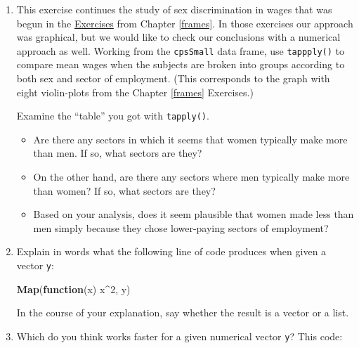 \documentclass[]{book}
\makeatletter
\newenvironment{Shaded}{\begin{snugshade}}{\end{snugshade}}
\newcommand{\KeywordTok}[1]{\textcolor[rgb]{0.13,0.29,0.53}{\textbf{#1}}}
\newcommand{\DecValTok}[1]{\textcolor[rgb]{0.00,0.00,0.81}{#1}}
\newcommand{\ControlFlowTok}[1]{\textcolor[rgb]{0.13,0.29,0.53}{\textbf{#1}}}
\newcommand{\OperatorTok}[1]{\textcolor[rgb]{0.81,0.36,0.00}{\textbf{#1}}}
\newcommand{\NormalTok}[1]{#1}
\providecommand{\tightlist}{%
  \setlength{\itemsep}{0pt}\setlength{\parskip}{0pt}}
\newenvironment{kframe}{%
\medskip{}
\setlength{\fboxsep}{.8em}
 \def\at@end@of@kframe{}%
 \ifinner\ifhmode%
  \def\at@end@of@kframe{\end{minipage}}%
  \begin{minipage}{\columnwidth}%
 \fi\fi%
 \def\FrameCommand##1{\hskip\@totalleftmargin \hskip-\fboxsep
 \colorbox{shadecolor}{##1}\hskip-\fboxsep
     \hskip-\linewidth \hskip-\@totalleftmargin \hskip\columnwidth}%
 \MakeFramed {\advance\hsize-\width
   \@totalleftmargin\z@ \linewidth\hsize
   \@setminipage}}%
 {\par\unskip\endMakeFramed%
 \at@end@of@kframe}
\renewenvironment{Shaded}{\begin{kframe}}{\end{kframe}}
\theoremstyle{definition}
\theoremstyle{definition}
\theoremstyle{definition}
\theoremstyle{remark}
\makeatother
\begin{document}
{\begin{enumerate}
  Your task is to use \texttt{quantile()} to write a function called
  \texttt{iqRange()} that will return the interquartile range of any
  given numerical vector. Then use that function with \texttt{tapply()}
  to get the interquartile ranges for the fastest speeds in the
  \texttt{m111survey} data, where the students are broken into groups
  according to both seating preference and sex.
\item
  This exercise continues the study of sex discrimination in wages that
  was begun in the \protect\hyperlink{frames-exercises}{Exercises} from
  Chapter \ref{frames}. In those exercises our approach was graphical,
  but we would like to check our conclusions with a numerical approach
  as well. Working from the \texttt{cpsSmall} data frame, use
  \texttt{tappply()} to compare mean wages when the subjects are broken
  into groups according to both sex and sector of employment. (This
  corresponds to the graph with eight violin-plots from the Chapter
  \ref{frames} Exercises.)

  Examine the ``table'' you got with \texttt{tapply()}.

  \begin{itemize}
  \tightlist
  \item
    Are there any sectors in which it seems that women typically make
    more than men. If so, what sectors are they?
  \item
    On the other hand, are there any sectors where men typically make
    more than women? If so, what sectors are they?
  \item
    Based on your analysis, does it seem plausible that women made less
    than men simply because they chose lower-paying sectors of
    employment?
  \end{itemize}
\item
  Explain in words what the following line of code produces when given a
  vector \texttt{y}:

\begin{Shaded}
\begin{Highlighting}[]
\KeywordTok{Map}\NormalTok{(}\ControlFlowTok{function}\NormalTok{(x) x}\OperatorTok{^}\DecValTok{2}\NormalTok{, y)}
\end{Highlighting}
\end{Shaded}

  In the course of your explanation, say whether the result is a vector
  or a list.
\item
  Which do you think works faster for a given numerical vector
  \texttt{y}? This code:


\end{enumerate}}
\end{document}
